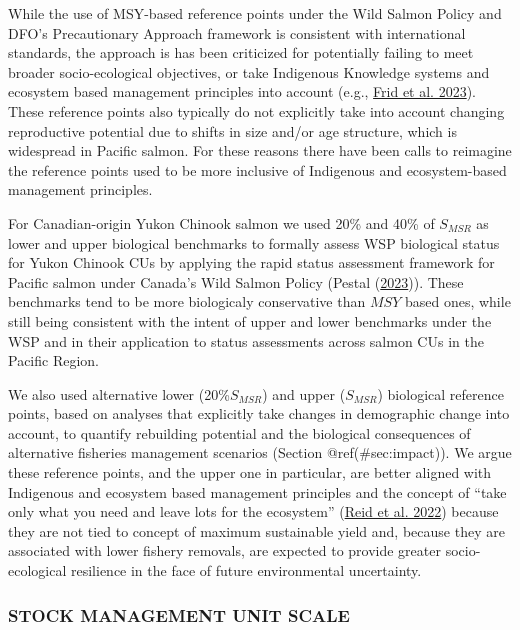 \documentclass[11pt]{book}
\begin{document}
While the use of MSY-based reference points under the Wild Salmon Policy and DFO's Precautionary Approach framework is consistent with international standards, the approach is has been criticized for potentially failing to meet broader socio-ecological objectives, or take Indigenous Knowledge systems and ecosystem based management principles into account (e.g., \protect\hyperlink{ref-frid2023re}{Frid et al. 2023}). These reference points also typically do not explicitly take into account changing reproductive potential due to shifts in size and/or age structure, which is widespread in Pacific salmon. For these reasons there have been calls to reimagine the reference points used to be more inclusive of Indigenous and ecosystem-based management principles.

For Canadian-origin Yukon Chinook salmon we used 20\% and 40\% of \(S_{MSR}\) as lower and upper biological benchmarks to formally assess WSP biological status for Yukon Chinook CUs by applying the rapid status assessment framework for Pacific salmon under Canada's Wild Salmon Policy (Pestal (\protect\hyperlink{ref-pestal2023state}{2023})). These benchmarks tend to be more biologicaly conservative than \(MSY\) based ones, while still being consistent with the intent of upper and lower benchmarks under the WSP and in their application to status assessments across salmon CUs in the Pacific Region.

We also used alternative lower (20\%\(S_{MSR}\)) and upper (\(S_{MSR}\)) biological reference points, based on analyses that explicitly take changes in demographic change into account, to quantify rebuilding potential and the biological consequences of alternative fisheries management scenarios (Section @ref(\#sec:impact)). We argue these reference points, and the upper one in particular, are better aligned with Indigenous and ecosystem based management principles and the concept of ``take only what you need and leave lots for the ecosystem'' (\protect\hyperlink{ref-reid2022protecting}{Reid et al. 2022}) because they are not tied to concept of maximum sustainable yield and, because they are associated with lower fishery removals, are expected to provide greater socio-ecological resilience in the face of future environmental uncertainty.

\hypertarget{stock-management-unit-scale}{%
\subsubsection{STOCK MANAGEMENT UNIT SCALE}\label{stock-management-unit-scale}}
\end{document}
